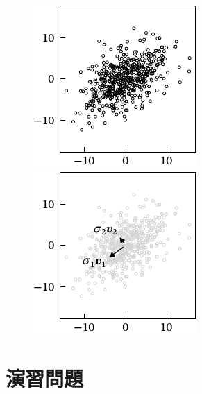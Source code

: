\documentclass[../../main]{subfiles}
\begin{document}
\begin{figure}[htbp]
  \begin{minipage}{\linewidth/2}
    \centering
    \includegraphics{figures/scatter.pdf}
  \end{minipage}%
  \begin{minipage}{\linewidth/2}
    \centering
    \includegraphics{figures/pca.pdf}
  \end{minipage}
\end{figure}

\section{演習問題}
\end{document}
